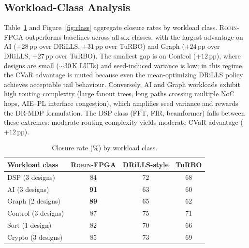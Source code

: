 \documentclass[journal,onecolumn=false]{IEEEtran}
\begin{document}
\subsection{Workload-Class Analysis}
\label{sec:classanalysis}

Table~\ref{tab:class} and Figure~\ref{fig:class} aggregate closure rates by workload class. \textsc{Robin-FPGA} outperforms baselines across all six classes, with the largest advantage on AI ($+28$\,pp over DRiLLS, $+31$\,pp over TuRBO) and Graph ($+24$\,pp over DRiLLS, $+27$\,pp over TuRBO). The smallest gap is on Control ($+12$\,pp), where designs are small (${\sim}30$\,K LUTs) and seed-induced variance is low; in this regime the CVaR advantage is muted because even the mean-optimizing DRiLLS policy achieves acceptable tail behaviour. Conversely, AI and Graph workloads exhibit high routing complexity (large fanout trees, long paths crossing multiple NoC hops, AIE--PL interface congestion), which amplifies seed variance and rewards the DR-MDP formulation. The DSP class (FFT, FIR, beamformer) falls between these extremes: moderate routing complexity yields moderate CVaR advantage ($+12$\,pp).

\begin{table}[t]
\caption{Closure rate (\%) by workload class.}
\label{tab:class}
\centering
\footnotesize
\begin{tabular}{@{}lccc@{}}
\toprule
Workload class & \textsc{Robin-FPGA} & DRiLLS-style & TuRBO \\
\midrule
DSP (3 designs)      & 84 & 72 & 68 \\
AI (3 designs)       & \textbf{91} & 63 & 60 \\
Graph (2 designs)    & \textbf{89} & 65 & 62 \\
Control (3 designs)  & 87 & 75 & 71 \\
Sort (1 design)      & 82 & 70 & 66 \\
Crypto (3 designs)   & 85 & 73 & 69 \\
\bottomrule
\end{tabular}
\end{table}
\end{document}
